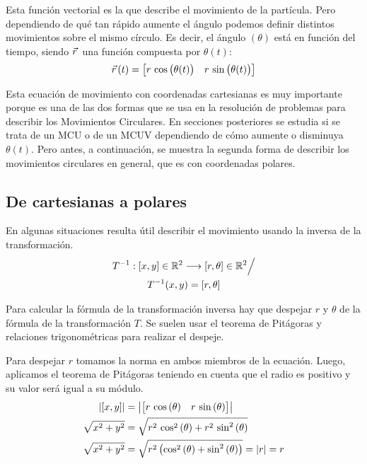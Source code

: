 \documentclass[a5paper,12pt,twoside]{book}
\begin{document}
Esta función vectorial es la que describe el movimiento de la partícula. Pero dependiendo de qué tan rápido aumente el ángulo podemos definir distintos movimientos sobre el mismo círculo. Es decir, el ángulo $(\theta)$ está en función del tiempo, siendo $\vec{r}\hspace{0.05cm}$ una función compuesta por $\theta (t)$:
\[
  \vec{r}\hspace{0.05cm}(t) =
    \begin{bmatrix}
        r \, \cos{\big( \theta (t) \big)} & r \, \sin{\big( \theta (t) \big)}
    \end{bmatrix}
\]

Esta ecuación de movimiento con coordenadas cartesianas es muy importante porque es una de las dos formas que se usa en la resolución de problemas para describir los Movimientos Circulares. En secciones posteriores se estudia si se trata de un MCU o de un MCUV dependiendo de cómo aumente o disminuya $\theta(t)$. Pero antes, a continuación, se muestra la segunda forma de describir los movimientos circulares en general, que es con coordenadas polares.

\subsection{De cartesianas a polares}

En algunas situaciones resulta útil describir el movimiento usando la inversa de la transformación.
\begin{multline*}
  T^{-1}:[x,y] \in \mathbb{R}^2 \longrightarrow [r,\theta] \in \mathbb{R}^2 \Big/ \\
  T^{-1} (x,y) = [r,\theta]
\end{multline*}

Para calcular la fórmula de la transformación inversa hay que despejar $r$ y $\theta$ de la fórmula de la transformación $T$. Se suelen usar el teorema de Pitágoras y relaciones trigonométricas para realizar el despeje.

Para despejar $r$ tomamos la norma en ambos miembros de la ecuación. Luego, aplicamos el teorema de Pitágoras teniendo en cuenta que el radio es positivo y su valor será igual a su módulo.
\begin{align*}
  {\left| {[x,y]} \right|} &= {\left| {\begin{bmatrix} r \, \cos{(\theta)} & r \, \sin{(\theta)} \end{bmatrix}} \right|}
  \\
  \sqrt{x^2 + y^2} &= \sqrt{r^2 \, \cos^2{(\theta)} + r^2 \, \sin^2{(\theta)}}
  \\
  \sqrt{x^2 + y^2} &= \sqrt{r^2 \left( \cos^2{(\theta)} + \sin^2{(\theta)} \right)} = |r| = r
\end{align*}
\end{document}
